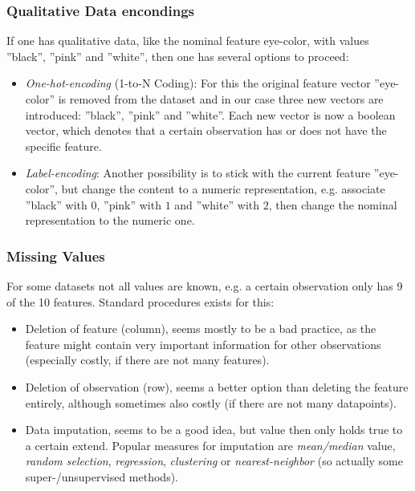 \documentclass[12pt,a4paper]{article}
\begin{document}
\subsubsection{Qualitative Data encondings}

\noindent If one has qualitative data, like the nominal feature eye-color, with values ''black'', ''pink'' and ''white'', then one has several options to proceed:

\begin{itemize}
    \item \textit{One-hot-encoding} (1-to-N Coding): For this the original feature vector ''eye-color'' is removed from the dataset and in our case three new vectors are introduced: ''black'', ''pink'' and ''white''. Each new vector is now a boolean vector, which denotes that a certain observation has or does not have the specific feature.
    \item \textit{Label-encoding}: Another possibility is to stick with the current feature ''eye-color'', but change the content to a numeric representation, e.g. associate ''black'' with \(0\), ''pink'' with \(1\) and ''white'' with \(2\), then change the nominal representation to the numeric one.
\end{itemize}

\subsubsection{Missing Values}

\noindent For some datasets not all values are known, e.g. a certain observation only has 9 of the 10 features. Standard procedures exists for this:

\begin{itemize}
    \item Deletion of feature (column), seems mostly to be a bad practice, as the feature might contain very important information for other observations (especially costly, if there are not many features).
    \item Deletion of observation (row), seems a better option than deleting the feature entirely, although sometimes also costly (if there are not many datapoints).
    \item Data imputation, seems to be a good idea, but value then only holds true to a certain extend. Popular measures for imputation are \textit{mean/median} value, \textit{random selection}, \textit{regression}, \textit{clustering} or \textit{nearest-neighbor} (so actually some super-/unsupervised methods).
\end{itemize}
\end{document}
